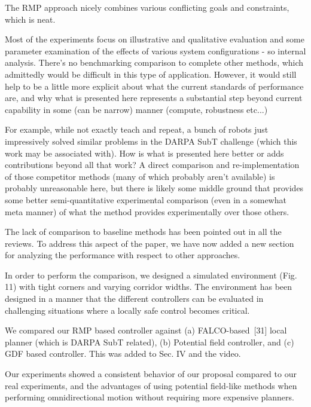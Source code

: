 \documentclass[a4paper,11pt]{article}
\begin{document}
\begin{displayquote}
	The RMP approach nicely combines various conflicting goals and
	constraints, which is neat.
	
	Most of the experiments focus on illustrative and qualitative
	evaluation and some parameter examination of the effects of various
	system configurations - so internal analysis. There's no benchmarking
	comparison to complete other methods, which admittedly would be
	difficult in this type of application. However, it would still help to
	be a little more explicit about what the current standards of
	performance are, and why what is presented here represents a
	substantial step beyond current capability in some (can be narrow)
	manner (compute, robustness etc...)
	
	For example, while not exactly teach and repeat, a bunch of robots just
	impressively solved similar problems in the DARPA SubT challenge (which
	this work may be associated with). How is what is presented here better
	or adds contributions beyond all that work? A direct comparison and
	re-implementation of those competitor methods (many of which probably
	aren't available) is probably unreasonable here, but there is likely
	some middle ground that provides some better semi-quantitative
	experimental comparison (even in a somewhat meta manner) of what the
	method provides experimentally over those others. 
\end{displayquote}


\begin{outline}[enumerate]
	\1 The lack of comparison to baseline methods has been pointed out in all
	the reviews. To address this aspect of the paper, we have now added a new 
	section for analyzing the performance with respect to other approaches.
	
	\1 In order to perform the comparison, we designed a simulated 
	environment (Fig. 11) with tight corners and varying corridor widths. The 
	environment has been designed in a manner that the different controllers 
	can be evaluated in challenging situations where a locally safe control 
	becomes critical.
	
	\1 We compared our RMP based controller against (a) FALCO-based~[31] 
	local planner (which is DARPA SubT related), (b) Potential field 
	controller, and (c) GDF based controller. This was added to Sec. IV and the 
	video.
	
	\1 Our experiments showed a consistent behavior of our proposal compared to 
	our real experiments, and the advantages of using potential field-like 
	methods when performing omnidirectional motion without requiring more 
	expensive planners.
\end{outline}
\end{document}
